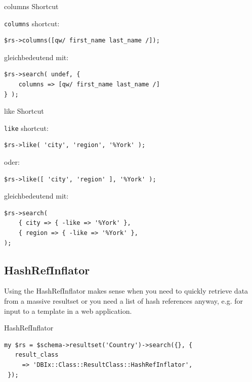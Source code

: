 \begin{frame}[fragile]{columns Shortcut}

\verb|columns| shortcut:

\begin{lstlisting}
$rs->columns([qw/ first_name last_name /]);
\end{lstlisting}

gleichbedeutend mit:

\begin{lstlisting}
$rs->search( undef, { 
    columns => [qw/ first_name last_name /] 
} );
\end{lstlisting}
\end{frame}

\begin{frame}[fragile]{like Shortcut}

\verb|like| shortcut:

\begin{lstlisting}
$rs->like( 'city', 'region', '%York' );
\end{lstlisting}

oder:

\begin{lstlisting}
$rs->like([ 'city', 'region' ], '%York' );
\end{lstlisting}

gleichbedeutend mit:

\begin{lstlisting}
$rs->search(
    { city => { -like => '%York' },
    { region => { -like => '%York' },
);
\end{lstlisting}
\end{frame}

\subsection{HashRefInflator}

Using the HashRefInflator makes sense when you need to quickly retrieve
data from a massive resultset or you need a list of hash references anyway,
e.g. for input to a template in a web application.

\begin{frame}[fragile]{HashRefInflator}
\begin{lstlisting}
my $rs = $schema->resultset('Country')->search({}, {
   result_class
     => 'DBIx::Class::ResultClass::HashRefInflator',
 });
\end{lstlisting}
\end{frame}

